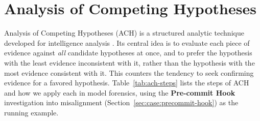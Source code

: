 \documentclass{article}
\begin{document}
\section{Analysis of Competing Hypotheses}
\label{app:ach}

Analysis of Competing Hypotheses (ACH) is a structured analytic technique developed for intelligence analysis \citep{heuer1999psychology}. Its central idea is to evaluate each piece of evidence against \textit{all} candidate hypotheses at once, and to prefer the hypothesis with the least evidence inconsistent with it, rather than the hypothesis with the most evidence consistent with it. This counters the tendency to seek confirming evidence for a favored hypothesis. Table~\ref{tab:ach-steps} lists the steps of ACH and how we apply each in model forensics, using the \textbf{Pre-commit Hook} investigation into misalignment (Section~\ref{sec:case:precommit-hook}) as the running example.
\end{document}
